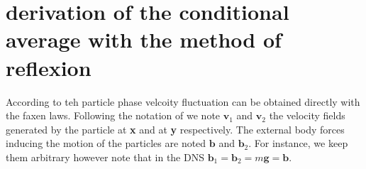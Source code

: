 \section{derivation of the conditional average with the method of reflexion}


According to \citet{kim2013microhydrodynamics,zhang2021ensemble} teh particle phase velcoity fluctuation can be obtained directly with the faxen laws.
Following the notation of \citet{kim2013microhydrodynamics} we note $\textbf{v}_1$ and $\textbf{v}_2$ the velocity fields generated by the particle at \textbf{x} and at \textbf{y} respectively. 
The external body forces inducing the motion of the particles are noted $\textbf{b}$ and $\textbf{b}_2$. 
For instance, we keep them arbitrary however note that in the DNS $\textbf{b}_1 = \textbf{b}_2 = m\textbf{g} = \textbf{b}$. 


